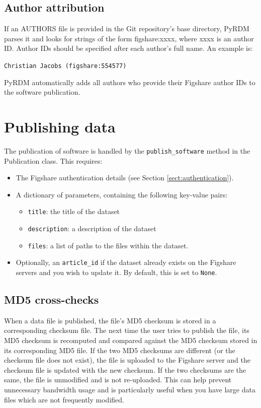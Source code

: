 \documentclass[a4paper,11pt]{report}
\begin{document}
\subsection{Author attribution}
If an AUTHORS file is provided in the Git repository's base directory, PyRDM parses it and looks for strings of the form figshare:xxxx, where xxxx is an author ID. Author IDs should be specified after each author's full name. An example is: 

\texttt{Christian Jacobs (figshare:554577)}

PyRDM automatically adds all authors who provide their Figshare author IDs to the software publication.

\section{Publishing data}
The publication of software is handled by the \texttt{publish\_software} method in the Publication class. This requires:

\begin{itemize}
  \item The Figshare authentication details (see Section \ref{sect:authentication}).
  \item A dictionary of parameters, containing the following key-value pairs:
    \begin{itemize}
      \item \texttt{title}: the title of the dataset
      \item \texttt{description}: a description of the dataset
      \item \texttt{files}: a list of paths to the files within the dataset.
    \end{itemize}
  \item Optionally, an \texttt{article\_id} if the dataset already exists on the Figshare servers and you wish to update it. By default, this is set to \texttt{None}.
\end{itemize}

\subsection{MD5 cross-checks}
When a data file is published, the file's MD5 checksum is stored in a corresponding checksum file. The next time the user tries to publish the file, its MD5 checksum is recomputed and compared against the MD5 checksum stored in its corresponding MD5 file. If the two MD5 checksums are different (or the checksum file does not exist), the file is uploaded to the Figshare server and the checksum file is updated with the new checksum. If the two checksums are the same, the file is unmodified and is not re-uploaded. This can help prevent unnecessary bandwidth usage and is particularly useful when you have large data files which are not frequently modified.
\end{document}
